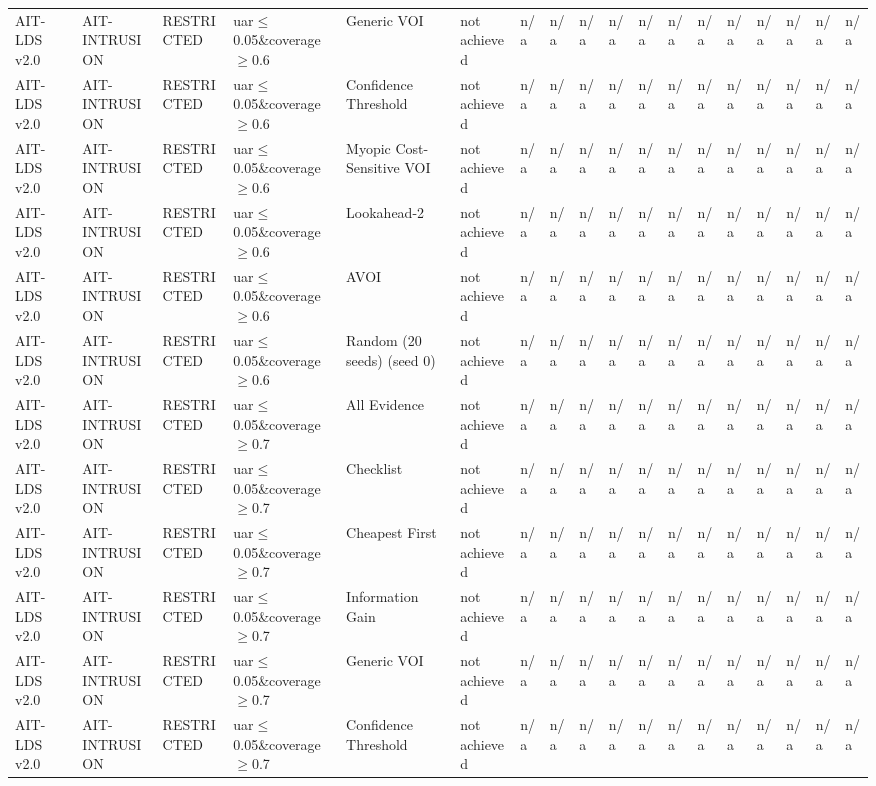 \begin{table}[!ht]
{\begin{tabular}{llllllllllllllllll}
AIT-LDS v2.0 & AIT-INTRUSION & RESTRICTED & uar$\le$0.05\&coverage$\ge$0.6 & Generic VOI & not achieved & n/a & n/a & n/a & n/a & n/a & n/a & n/a & n/a & n/a & n/a & n/a & n/a \\
AIT-LDS v2.0 & AIT-INTRUSION & RESTRICTED & uar$\le$0.05\&coverage$\ge$0.6 & Confidence Threshold & not achieved & n/a & n/a & n/a & n/a & n/a & n/a & n/a & n/a & n/a & n/a & n/a & n/a \\
AIT-LDS v2.0 & AIT-INTRUSION & RESTRICTED & uar$\le$0.05\&coverage$\ge$0.6 & Myopic Cost-Sensitive VOI & not achieved & n/a & n/a & n/a & n/a & n/a & n/a & n/a & n/a & n/a & n/a & n/a & n/a \\
AIT-LDS v2.0 & AIT-INTRUSION & RESTRICTED & uar$\le$0.05\&coverage$\ge$0.6 & Lookahead-2 & not achieved & n/a & n/a & n/a & n/a & n/a & n/a & n/a & n/a & n/a & n/a & n/a & n/a \\
AIT-LDS v2.0 & AIT-INTRUSION & RESTRICTED & uar$\le$0.05\&coverage$\ge$0.6 & AVOI & not achieved & n/a & n/a & n/a & n/a & n/a & n/a & n/a & n/a & n/a & n/a & n/a & n/a \\
AIT-LDS v2.0 & AIT-INTRUSION & RESTRICTED & uar$\le$0.05\&coverage$\ge$0.6 & Random (20 seeds) (seed 0) & not achieved & n/a & n/a & n/a & n/a & n/a & n/a & n/a & n/a & n/a & n/a & n/a & n/a \\
AIT-LDS v2.0 & AIT-INTRUSION & RESTRICTED & uar$\le$0.05\&coverage$\ge$0.7 & All Evidence & not achieved & n/a & n/a & n/a & n/a & n/a & n/a & n/a & n/a & n/a & n/a & n/a & n/a \\
AIT-LDS v2.0 & AIT-INTRUSION & RESTRICTED & uar$\le$0.05\&coverage$\ge$0.7 & Checklist & not achieved & n/a & n/a & n/a & n/a & n/a & n/a & n/a & n/a & n/a & n/a & n/a & n/a \\
AIT-LDS v2.0 & AIT-INTRUSION & RESTRICTED & uar$\le$0.05\&coverage$\ge$0.7 & Cheapest First & not achieved & n/a & n/a & n/a & n/a & n/a & n/a & n/a & n/a & n/a & n/a & n/a & n/a \\
AIT-LDS v2.0 & AIT-INTRUSION & RESTRICTED & uar$\le$0.05\&coverage$\ge$0.7 & Information Gain & not achieved & n/a & n/a & n/a & n/a & n/a & n/a & n/a & n/a & n/a & n/a & n/a & n/a \\
AIT-LDS v2.0 & AIT-INTRUSION & RESTRICTED & uar$\le$0.05\&coverage$\ge$0.7 & Generic VOI & not achieved & n/a & n/a & n/a & n/a & n/a & n/a & n/a & n/a & n/a & n/a & n/a & n/a \\
AIT-LDS v2.0 & AIT-INTRUSION & RESTRICTED & uar$\le$0.05\&coverage$\ge$0.7 & Confidence Threshold & not achieved & n/a & n/a & n/a & n/a & n/a & n/a & n/a & n/a & n/a & n/a & n/a & n/a \\

\end{tabular}}
\end{table}
